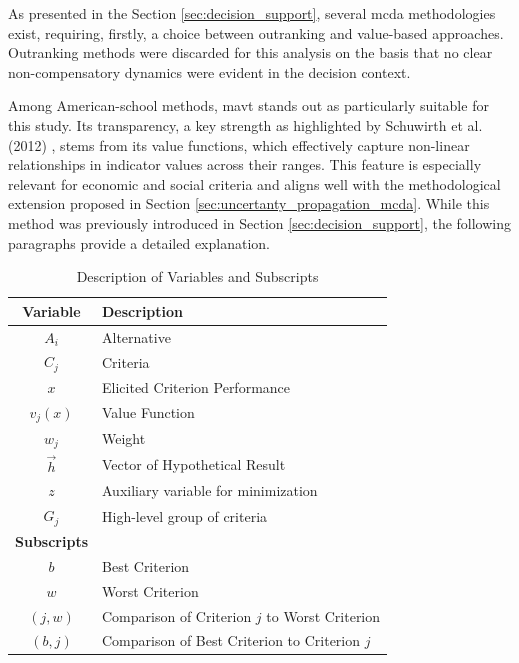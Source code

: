 \label{sec:methodology}
As presented in the Section \ref{sec:decision_support}, several \gls{mcda} methodologies exist, requiring, firstly, a choice between outranking and value-based approaches. Outranking methods were discarded for this analysis on the basis that no clear non-compensatory dynamics were evident in the decision context.

Among American-school methods, \gls{mavt} stands out as particularly suitable for this study. Its transparency, a key strength as highlighted by Schuwirth et al. (2012) \cite{SCHUWIRTH2012472}, stems from its value functions, which effectively capture non-linear relationships in indicator values across their ranges. This feature is especially relevant for economic and social criteria and aligns well with the methodological extension proposed in Section \ref{sec:uncertanty_propagation_mcda}. While this method was previously introduced in Section \ref{sec:decision_support}, the following paragraphs provide a detailed explanation.

\begin{table}[H]
   \centering
   \begin{tabularx}{0.85\textwidth}{cX}
      	\toprule
      	\textbf{Variable} & \textbf{Description} \\
      \midrule
      $A_i$ & Alternative \\
      $C_j$ & Criteria \\
      $x$ & Elicited Criterion Performance \\
      $v_j(x)$ & Value Function \\
      $w_j$ & Weight \\
      $\vec{h}$ & Vector of Hypothetical Result \\
      $z$ & Auxiliary variable for minimization \\
      $G_j$ & High-level group of criteria \\
      \midrule
      	\textbf{Subscripts} & \\
      \midrule
      $b$ & Best Criterion \\
      $w$ & Worst Criterion \\
      $(j,w)$ & Comparison of Criterion $j$ to Worst Criterion \\
      $(b,j)$ & Comparison of Best Criterion to Criterion $j$ \\
      \bottomrule
   \end{tabularx}
   \caption{Description of Variables and Subscripts}
   \label{tab:variables_description}
\end{table}

